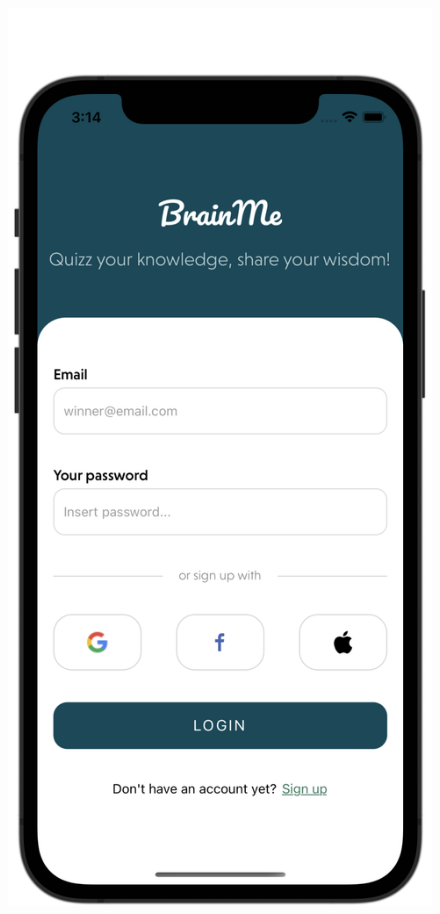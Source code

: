 \begin{figure}[H]
    \centering
    \begin{minipage}[b]{0.43\linewidth}
        \centering
        \includegraphics[width=\linewidth]{Mobile UI/Login.png}

\end{minipage}
\end{figure}
